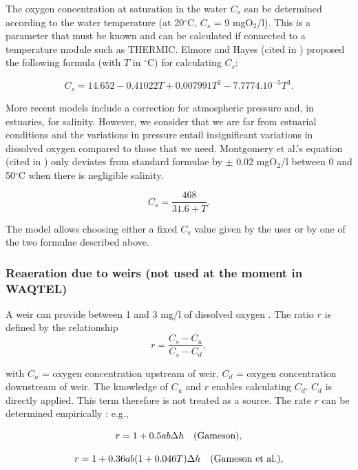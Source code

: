 The oxygen concentration at saturation in the water $C_s$ can be determined
according to the water temperature (at 20$^{\circ}$C, $C_s$ = 9 mgO$_2$/l).
This is a parameter that must be known and can be calculated
if connected to a temperature module such as THERMIC.
Elmore and Hayes (cited in \cite{mccutcheon_wq_1989}) proposed the following formula
(with $T$ in $^{\circ}$C) for calculating $C_s$:

\begin{equation}
  C_s = 14.652 - 0.41022 T + 0.007991 T^2 - 7.7774.10^{-5}T^3.
\end{equation}

More recent models include a correction for atmospheric pressure and, in estuaries, for salinity.
However, we consider that we are far from estuarial conditions and the variations in pressure
entail insignificant variations in dissolved oxygen compared to those that we need.
Montgomery et al.'s equation (cited in \cite{mccutcheon_wq_1989})
only deviates from standard formulae by $ \pm $  0.02 mgO$_2$/l
between 0 and 50$^{\circ}$C when there is negligible salinity.

\begin{equation}
  C_s = \frac{468}{31.6+T}.
\end{equation}

The model allows choosing either a fixed $C_s$ value given
by the user or by one of the two formulae described above.\\

\subsubsection{Reaeration due to weirs (not used at the moment in WAQTEL)}

A weir can provide between 1 and 3 mg/l of dissolved oxygen \cite{mccutcheon_wq_1989}.
The ratio $r$ is defined by the relationship $$r = \frac{C_s-C_u}{C_s-C_d},$$

with $C_u$ = oxygen concentration upstream of weir,
$C_d$ = oxygen concentration downstream of weir.
The knowledge of $C_u$ and $r$  enables calculating $C_d$.
$C_d$ is directly applied.
This term therefore is not treated as a source.
The rate $r$ can be determined empirically
\cite{mccutcheon_wq_1989}: e.g.,

\begin{equation}
  r = 1 + 0.5 a b \Delta h \quad \rm{(Gameson)},
\end{equation}

\begin{equation}
  r = 1+ 0.36 a b (1+0.046 T) \Delta h \quad \rm{(Gameson~et~al.)},
\end{equation}

